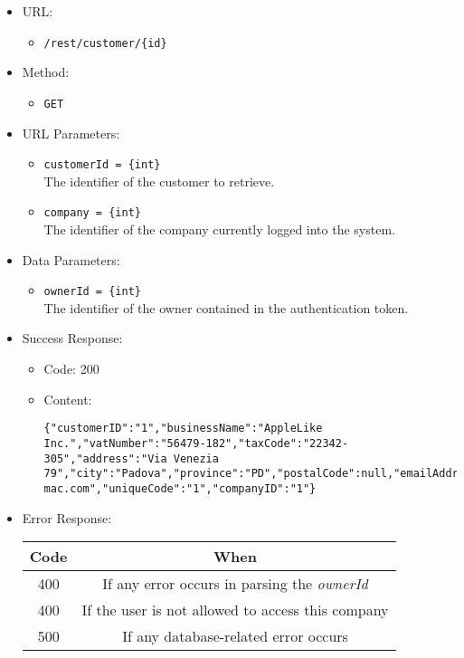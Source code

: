 \begin{itemize}
    
    \item URL: 
    \begin{itemize}
        \item \texttt{/rest/customer/\{id\}}
    \end{itemize}
    
    \item Method: 
    \begin{itemize}
        \item \texttt{GET}
    \end{itemize}
    
    \item URL Parameters: 
    \begin{itemize}
        \item \texttt{customerId = \{int\}} \\
        The identifier of the customer to retrieve.
        \item \texttt{company = \{int\}} \\
        The identifier of the company currently logged into the system.   
    \end{itemize}
    
    \item Data Parameters: 
    \begin{itemize}
        \item \texttt{ownerId = \{int\}} \\
        The identifier of the owner contained in the authentication token.
    \end{itemize}
    
    \item Success Response: 
    \begin{itemize}
        \item Code: 200
        \item Content:
        \begin{lstlisting}
{"customerID":"1","businessName":"AppleLike Inc.","vatNumber":"56479-182","taxCode":"22342-305","address":"Via Venezia 79","city":"Padova","province":"PD","postalCode":null,"emailAddress":"applelike@google.com","pec":"applelike@pec-mac.com","uniqueCode":"1","companyID":"1"}
        \end{lstlisting}        
    \end{itemize}
    
    \item Error Response:
    \begin{table}[!h]
    \centering 
    \begin{tabular}{|c|c|}
    \hline
    \multicolumn{1}{|c|}{\textbf{Code}} & \multicolumn{1}{c|}{\textbf{When}} \\ \hline
    400 & If any error occurs in parsing the \textit{ownerId}  \\\hline
    400 & If the user is not allowed to access this company \\\hline
    500 & If any database-related error occurs \\\hline
    \end{tabular} 
    \end{table} 
    

\end{itemize}
